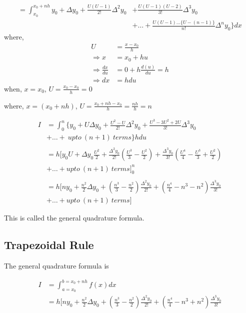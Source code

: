 \documentclass[11pt, a4paper, oneside]{book}
\begin{document}
        \begin{align*}
          =\int_{x_0}^{x_0+nh}y_0+\Delta y_0+\frac{U(U-1)}{2!}\Delta^2y_0 &+ \frac{U(U-1)(U-2)}{3!}\Delta^3y_0\\
                                                                          &+ \dots+\frac{U(U-1)\dots\{U-(n-1)\}}{n!}\Delta^ny_0\}dx
        \end{align*}
        where,
        \begin{align*}
                      U &= \frac{x-x_0}{h}\\
          \Rightarrow x &= x_0+hu\\
          \Rightarrow \frac{dx}{du} &= 0+h\frac{d(u)}{du}=h\\
          \Rightarrow dx &= hdu
        \end{align*}
        when, $x=x_0$, $U=\frac{x_0-x_0}{h}=0$

        \noindent where, $x=(x_0+nh)$, $U=\frac{x_0+nh-x_0}{h}=\frac{nh}{h}=n$

        \begin{align*}
          I &= \int_{0}^{n}\{y_0+U\Delta y_0+\frac{U^2-U}{2!}\Delta^2y_0+\frac{U^3-3U^2+2U}{3!}\Delta^3y_0\\
            &+ \dots +\ upto\ (n+1)\ terms\} hdu\\
            \ \\
            &= h[y_0U+\Delta y_0\frac{U^2}{2}+\frac{\Delta^2y_0}{2!}(\frac{U^3}{3}-\frac{U^2}{2})+\frac{\Delta^3y_0}{3!}(\frac{U^4}{4}-\frac{U^3}{3}+\frac{U^2}{2})\\
            &+ \dots+upto\ (n+1)\ terms]_{0}^{n}\\
            \ \\
            &= h[ny_0+\frac{n^2}{2}\Delta y_0+(\frac{n^3}{3}-\frac{n^2}{2})\frac{\Delta^2y_0}{2!}+(\frac{n^4}{4}-n^3-n^2)\frac{\Delta^3y_0}{3!}\\
            &+ \dots+upto\ (n+1)\ terms]
        \end{align*}

        This is called the general quadrature formula.%

        \subsection{Trapezoidal Rule}
          The general quadrature formula is

          \begin{align*}
            I &=\int_{a=x_0}^{b=x_0+nh}f(x)dx\\
              &= h[ny_0+\frac{n^2}{2}\Delta y_0+(\frac{n^3}{3}-\frac{n^2}{2})\frac{\Delta^2y_0}{2!}+(\frac{n^4}{4}-n^3+n^2)\frac{\Delta^3y_0}{3!}
          \end{align*}
\end{document}
